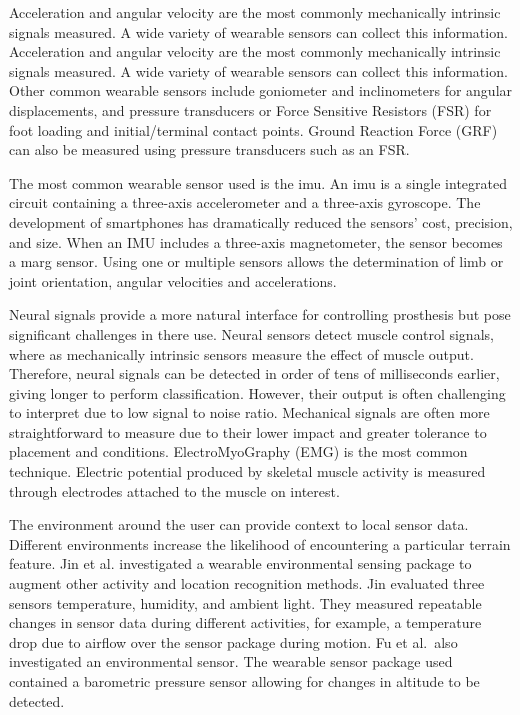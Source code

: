 Acceleration and angular velocity are the most commonly mechanically intrinsic signals measured. A wide variety of wearable sensors can collect this information.\cite{Shull2014, Tucker2015} Acceleration and angular velocity are the most commonly mechanically intrinsic signals measured. A wide variety of wearable sensors can collect this information. Other common wearable sensors include goniometer and inclinometers for angular displacements, and pressure transducers or Force Sensitive Resistors (FSR) for foot loading and initial/terminal contact points. Ground Reaction Force (GRF) can also be measured using pressure transducers such as an FSR\cite{Schepers2007}.

The most common wearable sensor used is the \acrfull{imu}\cite{Shull2014}. An \acrshort{imu} is a single integrated circuit containing a three-axis accelerometer and a three-axis gyroscope. The development of smartphones has dramatically reduced the sensors' cost, precision, and size. When an IMU includes a three-axis magnetometer, the sensor becomes a \acrfull{marg} sensor. Using one or multiple sensors allows the determination of limb or joint orientation, angular velocities and accelerations. 


Neural signals provide a more natural interface for controlling prosthesis\cite{He2018} but pose significant challenges in there use. Neural sensors detect muscle control signals, where as mechanically intrinsic sensors measure the effect of muscle output. Therefore, neural signals can be detected in order of tens of milliseconds earlier\cite{Tucker2015}, giving longer to perform classification. However, their output is often challenging to interpret due to low signal to noise ratio. Mechanical signals are often more straightforward to measure due to their lower impact and greater tolerance to placement and conditions.\cite{Koller2018} ElectroMyoGraphy (EMG) is the most common technique. Electric potential produced by skeletal muscle activity is measured through electrodes attached to the muscle on interest.

The environment around the user can provide context to local sensor data. Different environments increase the likelihood of encountering a particular terrain feature.\cite{Tucker2015, Tschiedel2020} Jin et al. investigated a wearable environmental sensing package to augment other activity and location recognition methods. Jin evaluated three sensors temperature, humidity, and ambient light. They measured repeatable changes in sensor data during different activities, for example, a temperature drop due to airflow over the sensor package during motion.\cite{Jin2014} Fu et al.~also investigated an environmental sensor. The wearable sensor package used contained a barometric pressure sensor allowing for changes in altitude to be detected\cite{Fu2021}.

